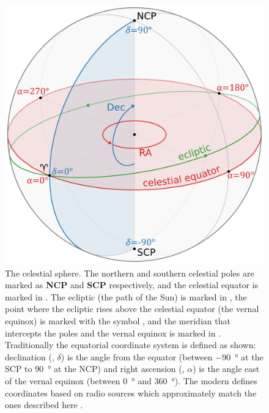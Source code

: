\begin{colsection}
\begin{figure}[t]
    \begin{center}
        \includegraphics[width=\linewidth]{images/globe1.pdf}
    \end{center}
    \caption[The celestial sphere]{
        The celestial sphere. The northern and southern celestial poles are marked as \textbf{NCP}  and \textbf{SCP}  respectively, and the celestial equator is marked in . The ecliptic (the path of the Sun) is marked in , the point where the ecliptic rises above the celestial equator (the vernal equinox) is marked with the symbol \Aries{}, and the meridian that intercepts the poles and the vernal equinox is marked in . Traditionally the equatorial coordinate system is defined as shown: declination (, $\delta$) is the angle from the equator (between \SI{-90}{\degree} at the SCP to \SI{90}{\degree} at the NCP) and right ascension (, $\alpha$)  is the angle east of the vernal equinox (between \SI{0}{\degree} and \SI{360}{\degree}). The modern  defines coordinates based on radio sources which approximately match the ones described here \citep{ICRF}.
    }\label{fig:sphere}
\end{figure}


\end{colsection}
